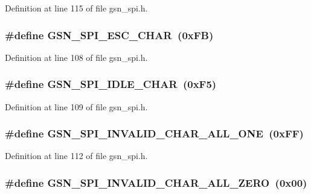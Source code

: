 Definition at line 115 of file gsn\_\-spi.h.

\hypertarget{a00587_a79b2c337c31c23b301ac9382b3f42f80}{
\subsubsection[{GSN\_\-SPI\_\-ESC\_\-CHAR}]{\setlength{\rightskip}{0pt plus 5cm}\#define GSN\_\-SPI\_\-ESC\_\-CHAR~(0xFB)}}
\label{a00587_a79b2c337c31c23b301ac9382b3f42f80}


Definition at line 108 of file gsn\_\-spi.h.

\hypertarget{a00587_a51128f266b2ad7b1dcc922aad7bab865}{
\subsubsection[{GSN\_\-SPI\_\-IDLE\_\-CHAR}]{\setlength{\rightskip}{0pt plus 5cm}\#define GSN\_\-SPI\_\-IDLE\_\-CHAR~(0xF5)}}
\label{a00587_a51128f266b2ad7b1dcc922aad7bab865}


Definition at line 109 of file gsn\_\-spi.h.

\hypertarget{a00587_a5da46db11267d953ab7f05b41c7531b7}{
\subsubsection[{GSN\_\-SPI\_\-INVALID\_\-CHAR\_\-ALL\_\-ONE}]{\setlength{\rightskip}{0pt plus 5cm}\#define GSN\_\-SPI\_\-INVALID\_\-CHAR\_\-ALL\_\-ONE~(0xFF)}}
\label{a00587_a5da46db11267d953ab7f05b41c7531b7}


Definition at line 112 of file gsn\_\-spi.h.

\hypertarget{a00587_aa59091c91594ff6b82a646aa28581b4f}{
\subsubsection[{GSN\_\-SPI\_\-INVALID\_\-CHAR\_\-ALL\_\-ZERO}]{\setlength{\rightskip}{0pt plus 5cm}\#define GSN\_\-SPI\_\-INVALID\_\-CHAR\_\-ALL\_\-ZERO~(0x00)}}
\label{a00587_aa59091c91594ff6b82a646aa28581b4f}


